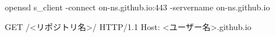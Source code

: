 openssl s_client -connect on-ns.github.io:443 -servername on-ns.github.io

GET /<リポジトリ名>/ HTTP/1.1
Host: <ユーザー名>.github.io
